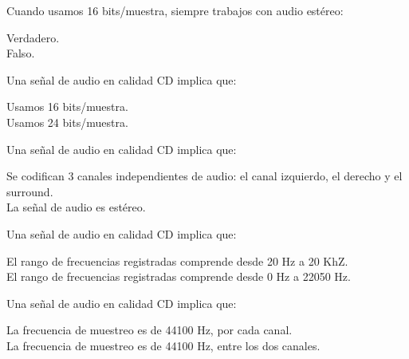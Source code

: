 \documentclass[legalpaper, 12pt, addpoints]{exam}
\begin{document}
\begin{questions}
\vspace{0.10in}

\question Cuando usamos 16 bits/muestra, siempre trabajos con audio estéreo:

\begin{oneparchoices}
  \choice Verdadero.\\
  \choice Falso.
\end{oneparchoices}
  
\vspace{0.10in}

\question Una señal de audio en calidad CD implica que:

\begin{oneparchoices}
  \choice Usamos 16 bits/muestra.\\
  \choice Usamos 24 bits/muestra.
\end{oneparchoices}
  
\vspace{0.10in}

\question Una señal de audio en calidad CD implica que:

\begin{oneparchoices}
  \choice Se codifican 3 canales independientes de audio: el canal izquierdo, el derecho y el surround.\\
  \choice La señal de audio es estéreo.
\end{oneparchoices}
  
\vspace{0.10in}

\question Una señal de audio en calidad CD implica que:

\begin{oneparchoices}
  \choice El rango de frecuencias registradas comprende desde 20 Hz a 20 KhZ.\\
  \choice El rango de frecuencias registradas comprende desde 0 Hz a 22050 Hz.
\end{oneparchoices}
  
\vspace{0.10in}

\question Una señal de audio en calidad CD implica que:

\begin{oneparchoices}
  \choice La frecuencia de muestreo es de 44100 Hz, por cada canal.\\
  \choice La frecuencia de muestreo es de 44100 Hz, entre los dos canales.
\end{oneparchoices}
  
\vspace{0.10in}


\end{questions}
\end{document}
